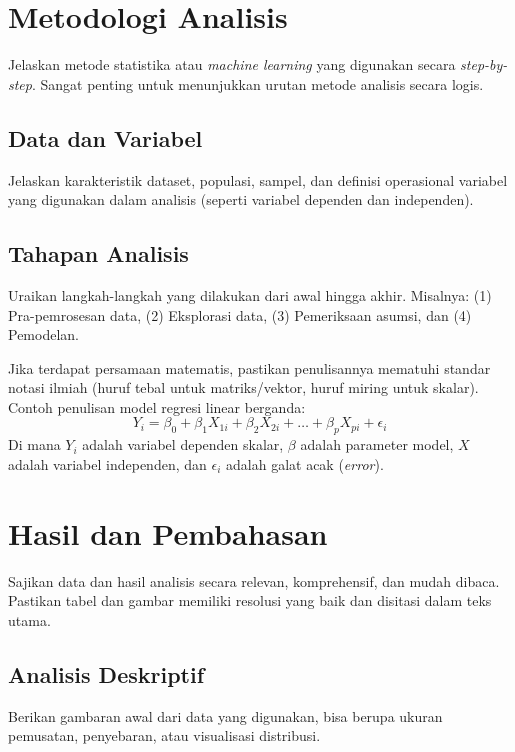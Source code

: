 \documentclass[12pt, a4paper]{article}
\begin{document}
\section{Metodologi Analisis}
Jelaskan metode statistika atau \textit{machine learning} yang digunakan secara \textit{step-by-step}. Sangat penting untuk menunjukkan urutan metode analisis secara logis.

\subsection{Data dan Variabel}
Jelaskan karakteristik dataset, populasi, sampel, dan definisi operasional variabel yang digunakan dalam analisis (seperti variabel dependen dan independen).

\subsection{Tahapan Analisis}
Uraikan langkah-langkah yang dilakukan dari awal hingga akhir. Misalnya: (1) Pra-pemrosesan data, (2) Eksplorasi data, (3) Pemeriksaan asumsi, dan (4) Pemodelan.

Jika terdapat persamaan matematis, pastikan penulisannya mematuhi standar notasi ilmiah (huruf tebal untuk matriks/vektor, huruf miring untuk skalar). Contoh penulisan model regresi linear berganda:
\begin{equation}
    Y_i = \beta_0 + \beta_1 X_{1i} + \beta_2 X_{2i} + \dots + \beta_p X_{pi} + \epsilon_i
\end{equation}
Di mana $Y_i$ adalah variabel dependen skalar, $\beta$ adalah parameter model, $X$ adalah variabel independen, dan $\epsilon_i$ adalah galat acak (\textit{error}).

\section{Hasil dan Pembahasan}
Sajikan data dan hasil analisis secara relevan, komprehensif, dan mudah dibaca. Pastikan tabel dan gambar memiliki resolusi yang baik dan disitasi dalam teks utama.

\subsection{Analisis Deskriptif}
Berikan gambaran awal dari data yang digunakan, bisa berupa ukuran pemusatan, penyebaran, atau visualisasi distribusi.
\end{document}
